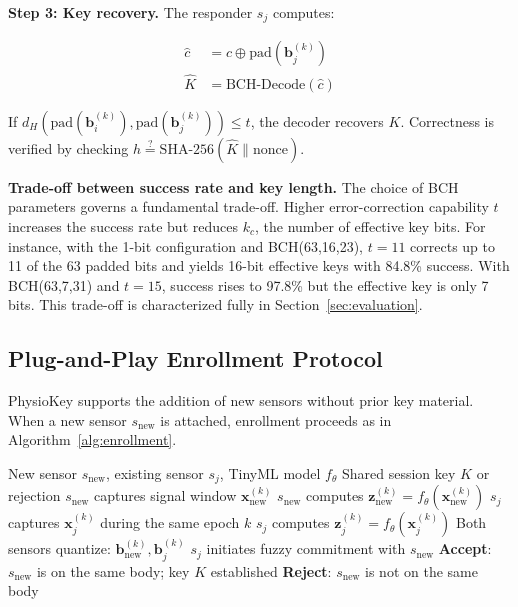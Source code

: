 \documentclass[sensors,article,submit,pdftex,moreauthors]{Definitions/mdpi}
\begin{document}
\textbf{Step 3: Key recovery.} The responder $s_j$ computes:

\begin{align}
\label{eq:recovery}
\hat{c} &= c \oplus \text{pad}(\mathbf{b}_j^{(k)}) \\
\hat{K} &= \text{BCH-Decode}(\hat{c})
\end{align}

If $d_H(\text{pad}(\mathbf{b}_i^{(k)}), \text{pad}(\mathbf{b}_j^{(k)})) \leq t$, the decoder recovers $K$. Correctness is verified by checking $h \stackrel{?}{=} \text{SHA-256}(\hat{K} \| \text{nonce})$.

\textbf{Trade-off between success rate and key length.} The choice of BCH parameters governs a fundamental trade-off. Higher error-correction capability $t$ increases the success rate but reduces $k_c$, the number of effective key bits. For instance, with the 1-bit configuration and BCH(63,16,23), $t = 11$ corrects up to 11 of the 63 padded bits and yields 16-bit effective keys with 84.8\% success. With BCH(63,7,31) and $t = 15$, success rises to 97.8\% but the effective key is only 7 bits. This trade-off is characterized fully in Section~\ref{sec:evaluation}.

\subsection{Plug-and-Play Enrollment Protocol}
\label{subsec:enrollment}

PhysioKey supports the addition of new sensors without prior key material. When a new sensor $s_{\text{new}}$ is attached, enrollment proceeds as in Algorithm~\ref{alg:enrollment}.

\begin{algorithm}[H]
\caption{PhysioKey Plug-and-Play Enrollment}
\label{alg:enrollment}
\begin{algorithmic}[1]
\REQUIRE New sensor $s_{\text{new}}$, existing sensor $s_j$, TinyML model $f_\theta$
\ENSURE Shared session key $K$ or rejection
\STATE $s_{\text{new}}$ captures signal window $\mathbf{x}_{\text{new}}^{(k)}$
\STATE $s_{\text{new}}$ computes $\mathbf{z}_{\text{new}}^{(k)} = f_\theta(\mathbf{x}_{\text{new}}^{(k)})$
\STATE $s_j$ captures $\mathbf{x}_j^{(k)}$ during the same epoch $k$
\STATE $s_j$ computes $\mathbf{z}_j^{(k)} = f_\theta(\mathbf{x}_j^{(k)})$
\STATE Both sensors quantize: $\mathbf{b}_{\text{new}}^{(k)}, \mathbf{b}_j^{(k)}$
\STATE $s_j$ initiates fuzzy commitment with $s_{\text{new}}$
    \STATE \textbf{Accept}: $s_{\text{new}}$ is on the same body; key $K$ established
\ELSE
    \STATE \textbf{Reject}: $s_{\text{new}}$ is not on the same body
\ENDIF
\end{algorithmic}
\end{algorithm}
\end{document}
